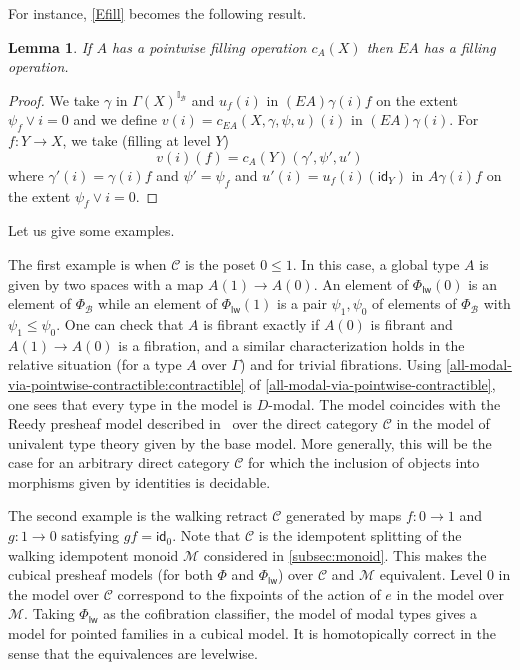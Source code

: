 \documentclass[10pt,a4paper,draft]{article}
\newcommand{\II}{\mathbb{I}}
\newcommand{\CC}{{\mathcal C}}
\newcommand{\id}{\mathsf{id}}
\newcommand{\BB}{\mathcal{B}}
\newcommand{\D}{D}              %
\newcommand{\E}{E}
\renewcommand{\~}{\widetilde}
\newcommand{\levelwise}{\mathsf{lw}}
\newcommand{\cofuniv}{\Phi}
\newcommand{\cofunivLW}{\Phi_{\levelwise}}
\newcommand{\cofunivConst}{\Phi}
\newcommand{\M}{\mathcal{M}}
\newtheorem{lemma}[theorem]{Lemma}
\theoremstyle{definition}
\theoremstyle{remark} %
\begin{document}
For instance, \cref{Efill} becomes the following result.

\begin{lemma}
  If $A$ has a pointwise filling operation $c_A(X)$ then $\E A$ has a filling operation.
\end{lemma}

\begin{proof}
  We take $\gamma$ in $\Gamma(X)^{\II_{\BB}}$ and $u_f(i)$ in $(\E A)\gamma(i)f$
  on the extent $\psi_f\vee i = 0$ and we define $v(i) = c_{\E A}(X,\gamma,\psi,u)(i)$
  in $(\E A)\gamma(i)$. For $f:Y\rightarrow X$, we take (filling at level $Y$)
  \begin{equation*}
  v(i)(f) = c_A(Y)(\gamma',\psi',u')
  \end{equation*}
  where $\gamma'(i) = \gamma(i)f$ and $\psi' = \psi_f$
  and $u'(i) = u_f(i)(\id_Y)$ in $A\gamma(i)f$ on the extent $\psi_f\vee i=0$.
\end{proof}

Let us give some examples.

\medskip

The first example is when $\CC$ is the poset $0 \leqslant 1$.
In this case, a global type $A$ is given by two spaces with a map $A(1)\rightarrow A(0)$.
An element of $\cofunivLW(0)$ is an element of $\cofuniv_{\BB}$ while an element of $\cofunivLW(1)$ is a pair $\psi_1,\psi_0$ of elements of $\cofuniv_{\BB}$ with $\psi_1\leqslant\psi_0$.
One can check that $A$ is fibrant exactly if $A(0)$ is fibrant and $A(1) \to A(0)$ is a fibration, and a similar characterization holds in the relative situation (for a type $A$ over $\Gamma$) and for trivial fibrations.
Using \cref{all-modal-via-pointwise-contractible:contractible} of \cref{all-modal-via-pointwise-contractible}, one sees that every type in the model is $\D$\hyp{}modal.
The model coincides with the Reedy presheaf model described in~\cite{Shulman15} over the direct category $\CC$ in the model of univalent type theory given by the base model.
More generally, this will be the case for an arbitrary direct category $\CC$ for which the inclusion of objects into morphisms given by identities is decidable.

\medskip

The second example is the walking retract $\CC$ generated by maps $f \colon 0 \to 1$ and $g \colon 1 \to 0$ satisfying $g f = \id_0$.
Note that $\CC$ is the idempotent splitting of the walking idempotent monoid $\M$ considered in \cref{subsec:monoid}.
This makes the cubical presheaf models (for both $\cofunivConst$ and $\cofunivLW$) over $\CC$ and $\M$ equivalent.
Level $0$ in the model over $\CC$ correspond to the fixpoints of the action of $e$ in the model over $\M$.
Taking $\cofunivLW$ as the cofibration classifier, the model of modal types gives a model for pointed families in a cubical model.
It is homotopically correct in the sense that the equivalences are levelwise.
\end{document}
